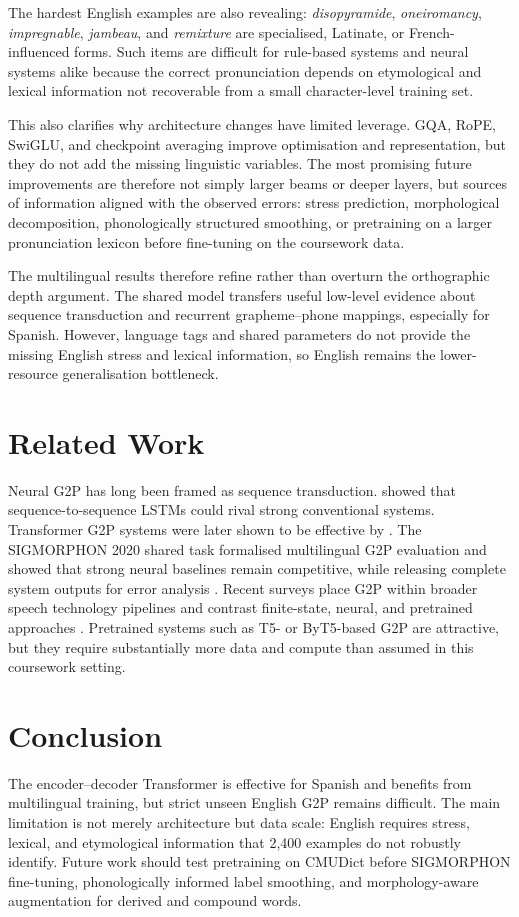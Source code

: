 \documentclass[11pt]{article}
\begin{document}
The hardest English examples are also revealing: \textit{disopyramide},
\textit{oneiromancy}, \textit{impregnable}, \textit{jambeau}, and
\textit{remixture} are specialised, Latinate, or French-influenced forms. Such
items are difficult for rule-based systems and neural systems alike because the
correct pronunciation depends on etymological and lexical information not
recoverable from a small character-level training set.

This also clarifies why architecture changes have limited leverage. GQA, RoPE,
SwiGLU, and checkpoint averaging improve optimisation and representation, but
they do not add the missing linguistic variables. The most promising future
improvements are therefore not simply larger beams or deeper layers, but
sources of information aligned with the observed errors: stress prediction,
morphological decomposition, phonologically structured smoothing, or pretraining
on a larger pronunciation lexicon before fine-tuning on the coursework data.

The multilingual results therefore refine rather than overturn the orthographic
depth argument. The shared model transfers useful low-level evidence about
sequence transduction and recurrent grapheme--phone mappings, especially for
Spanish. However, language tags and shared parameters do not provide the missing
English stress and lexical information, so English remains the lower-resource
generalisation bottleneck.

\section{Related Work}
\label{sec:related}

Neural G2P has long been framed as sequence transduction. \citet{yao2015sequence}
showed that sequence-to-sequence LSTMs could rival strong conventional systems.
Transformer G2P systems were later shown to be effective by
\citet{yolchuyeva2020transformer}. The SIGMORPHON 2020 shared task formalised
multilingual G2P evaluation and showed that strong neural baselines remain
competitive, while releasing complete system outputs for error analysis
\citep{gorman2020sigmorphon}. Recent surveys place G2P within broader speech
technology pipelines and contrast finite-state, neural, and pretrained
approaches \citep{cheng2024survey}. Pretrained systems such as T5- or
ByT5-based G2P are attractive, but they require substantially more data and
compute than assumed in this coursework setting.

\section{Conclusion}
\label{sec:conclusion}

The encoder--decoder Transformer is effective for Spanish and benefits from
multilingual training, but strict unseen English G2P remains difficult. The
main limitation is not merely architecture but data scale: English requires
stress, lexical, and etymological information that 2,400 examples do not
robustly identify. Future work should test pretraining on CMUDict before
SIGMORPHON fine-tuning, phonologically informed label smoothing, and
morphology-aware augmentation for derived and compound words.


\end{document}
